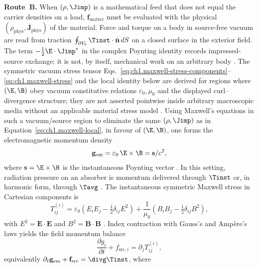 \textbf{Route~B.} When $(\rho,\Jimp)$ is a mathematical feed that does not equal the carrier densities on a load, $\mathbf{f}_{\mathrm{matter}}$ must be evaluated with the physical $(\rho_{\mathrm{phys}},\mathbf{J}_{\mathrm{phys}})$ of the material. Force and torque on a body in source-free vacuum are read from traction $\oint_{\partial V_b}\Tinst\cdot\hat{\mathbf{n}}\,dS$ on a closed surface in the exterior field. The term $-\tfrac12\E\cdot\Jimp^*$ in the complex Poynting identity records impressed-source exchange; it is not, by itself, mechanical work on an arbitrary body \cite{poynting1884,stratton1941,harrington2001}.
The symmetric vacuum stress tensor Eqs.~\eqref{eq:ch1.maxwell-stress-components}--\eqref{eq:ch1.maxwell-stress} and the local identity below are derived for regions where $(\E,\B)$ obey vacuum constitutive relations $\varepsilon_0,\mu_0$ and the displayed curl--divergence structure; they are not asserted pointwise inside arbitrary macroscopic media without an applicable material stress model \cite{stratton1941}. Using Maxwell's equations in such a vacuum/source region to eliminate the same $(\rho,\Jimp)$ as in Equation~\eqref{eq:ch1.maxwell-local}, in favour of $(\E,\B)$,
one forms the electromagnetic momentum density
\begin{equation}
\label{eq:ch1.momentum-density-instantaneous}
\mathbf{g}_{\mathrm{em}}=\varepsilon_0\,\E\times\B
=\mathbf{s}/c^2,
\end{equation}
where $\mathbf{s}=\E\times\H$ is the instantaneous Poynting vector \cite{maxwell1873,poynting1884}.
In this setting, radiation pressure on an absorber is momentum delivered through $\Tinst$ or, in harmonic form, through $\Tavg$ \cite{maxwell1873,stratton1941}. The instantaneous symmetric Maxwell stress in Cartesian components is
\begin{equation}
\label{eq:ch1.maxwell-stress-components}
T^{(i)}_{ij}=\varepsilon_0\!\left(E_iE_j-\tfrac12\delta_{ij}E^2\right)
+\frac{1}{\mu_0}\!\left(B_iB_j-\tfrac12\delta_{ij}B^2\right),
\end{equation}
with $E^2=\mathbf{E}\cdot\mathbf{E}$ and $B^2=\mathbf{B}\cdot\mathbf{B}$ \cite{maxwell1873,stratton1941}.
Index contraction with Gauss's and Amp\`ere's laws yields the field momentum balance
\begin{equation}
\label{eq:ch1.momentum-balance-instantaneous}
\frac{\partial g_{i}}{\partial t}+f_{\mathrm{src},i}=\partial_j T^{(i)}_{ij},
\end{equation}
equivalently $\partial_t\mathbf{g}_{\mathrm{em}}+\mathbf{f}_{\mathrm{src}}=\divg\Tinst$, where
